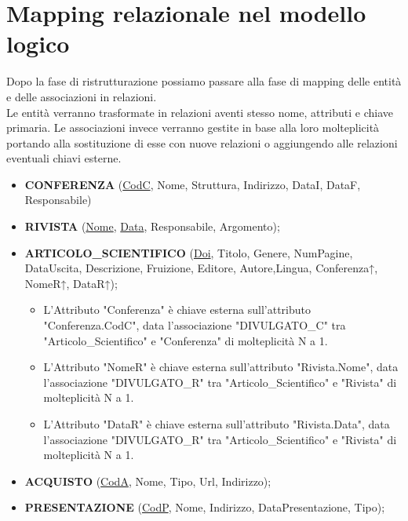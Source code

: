 
\chapter{Mapping relazionale nel modello logico}
\label{sec:Mapping}
    \large
    Dopo la fase di ristrutturazione possiamo passare alla fase di mapping delle entità e delle associazioni in relazioni.\\
    Le entità verranno trasformate in relazioni aventi  stesso nome, attributi e chiave primaria.
    Le associazioni invece verranno gestite in base alla loro molteplicità portando alla sostituzione di esse con nuove relazioni o aggiungendo alle relazioni eventuali chiavi esterne.
    
    \begin{itemize}
        \item {\bf CONFERENZA} (\underline{CodC}, Nome, Struttura, Indirizzo, DataI, DataF, Responsabile)
        
        \item {\bf RIVISTA} (\underline{Nome}, \underline{Data}, Responsabile, Argomento);
        
        \item {\bf ARTICOLO\_SCIENTIFICO} (\underline{Doi}, Titolo, Genere, NumPagine, DataUscita, Descrizione, Fruizione, Editore, Autore,Lingua, Conferenza↑, NomeR↑, DataR↑);
        \begin{itemize}
            \item L'Attributo "Conferenza" è chiave esterna sull'attributo "Conferenza.CodC", data l'associazione "DIVULGATO\_C" tra "Articolo\_Scientifico" e "Conferenza" di molteplicità N a 1.
            \item L'Attributo "NomeR" è chiave esterna sull'attributo "Rivista.Nome", data l'associazione "DIVULGATO\_R" tra "Articolo\_Scientifico" e "Rivista" di molteplicità N a 1.
            \item L'Attributo "DataR" è chiave esterna sull'attributo "Rivista.Data", data l'associazione "DIVULGATO\_R" tra "Articolo\_Scientifico" e "Rivista" di molteplicità N a 1.
        \end{itemize}
               
        \item {\bf ACQUISTO} (\underline{CodA}, Nome, Tipo, Url, Indirizzo);
        
        \item {\bf PRESENTAZIONE} (\underline{CodP}, Nome, Indirizzo, DataPresentazione, Tipo);
        

\end{itemize}

